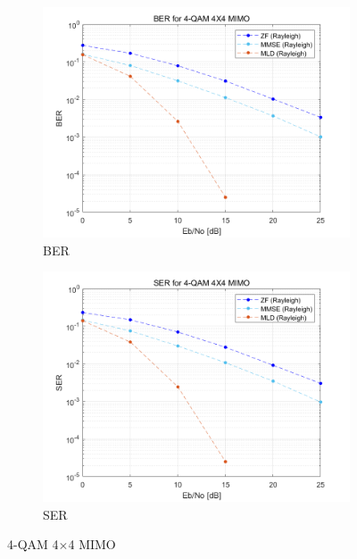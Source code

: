 \documentclass{article}
\begin{document}
\begin{figure}[H]
\begin{subfigure}{0.5\textwidth}
		\centerline{\includegraphics[width=1\textwidth]{c_Eb_BER.png}}
		\caption{BER}
	\end{subfigure}%
	\begin{subfigure}{0.5\textwidth}
		\centerline{\includegraphics[width=1\textwidth]{c_Eb_SER.png}}
		\caption{SER}
	\end{subfigure}%
	\caption{4-QAM 4$\times$4 MIMO}
\end{figure}
\end{document}
